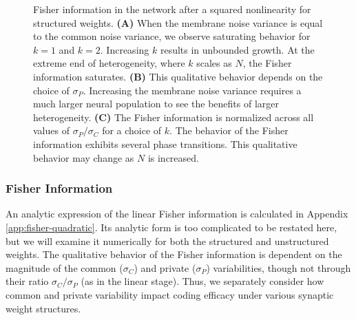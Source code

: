 \documentclass[11pt]{article}
\begin{document}
\begin{figure}[t]
	\centering
	\caption{Fisher information in the network after a squared nonlinearity for structured weights. \textbf{(A)} When the membrane noise variance is equal to the common noise variance, we observe saturating behavior for $k=1$ and $k=2$. Increasing $k$ results in unbounded growth. At the extreme end of heterogeneity, where $k$ scales as $N$, the Fisher information saturates. \textbf{(B)} This qualitative behavior depends on the choice of $\sigma_P$. Increasing the membrane noise variance requires a much larger neural population to see the benefits of larger heterogeneity. \textbf{(C)} The Fisher information is normalized across all values of $\sigma_P/\sigma_C$ for a choice of $k$. The behavior of the Fisher information exhibits several phase transitions. This qualitative behavior may change as $N$ is increased.}
	\label{fig:fisher-quadratic}
\end{figure}

	\subsubsection{Fisher Information}
	An analytic expression of the linear Fisher information is calculated in Appendix \ref{app:fisher-quadratic}. Its analytic form is too complicated to be restated here, but we will examine it numerically for both the structured and unstructured weights. The qualitative behavior of the Fisher information is dependent on the magnitude of the common ($\sigma_C$) and private ($\sigma_P$) variabilities, though not through their ratio $\sigma_C/\sigma_P$ (as in the linear stage). Thus, we separately consider how common and private variability impact coding efficacy under various synaptic weight structures.
	
\end{document}
